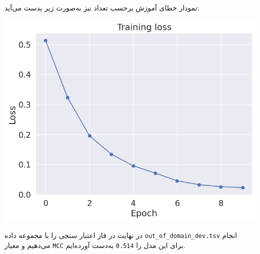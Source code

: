 \begin{qsolve}
	نمودار خطای آموزش برحسب تعداد  نیز به‌صورت زیر بدست می‌آید:
	
	\begin{center}
		\includegraphics*[width=0.7\linewidth]{pics/img15.png}
		\label{نمودار خطای آموزش}
	\end{center}
	
	در نهایت در فاز اعتبار سنجی را با مجموعه داده \texttt{out\_of\_domain\_dev.tsv}
	انجام می‌دهیم و معیار \texttt{MCC} برای این مدل را \texttt{0.514} به‌دست آورده‌ایم.
	
	
\end{qsolve}
